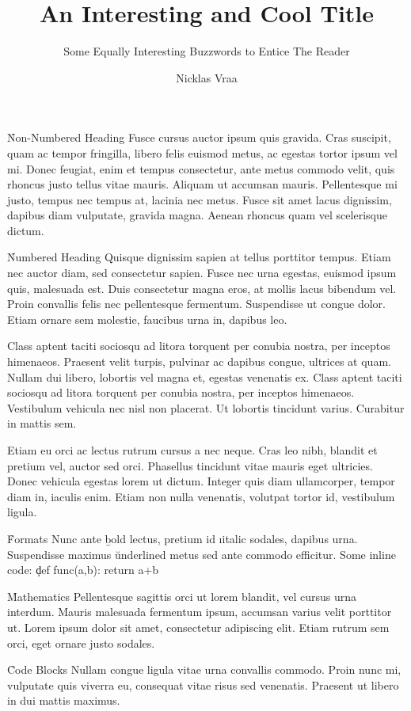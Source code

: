 \documentclass{article}
\title    {An Interesting and Cool Title}
\subtitle {Some Equally Interesting Buzzwords to Entice The Reader}
\author   {Nicklas Vraa}
\begin{document}
\h*{Non-Numbered Heading}
Fusce cursus auctor ipsum quis gravida. Cras suscipit, quam ac tempor fringilla, libero felis euismod metus, ac egestas tortor ipsum vel mi. Donec feugiat, enim et tempus consectetur, ante metus commodo velit, quis rhoncus justo tellus vitae mauris. Aliquam ut accumsan mauris. Pellentesque mi justo, tempus nec tempus at, lacinia nec metus. Fusce sit amet lacus dignissim, dapibus diam vulputate, gravida magna. Aenean rhoncus quam vel scelerisque dictum.

\h{Numbered Heading}
Quisque dignissim sapien at tellus porttitor tempus. Etiam nec auctor diam, sed consectetur sapien. Fusce nec urna egestas, euismod ipsum quis, malesuada est. Duis consectetur magna eros, at mollis lacus bibendum vel. Proin convallis felis nec pellentesque fermentum. Suspendisse ut congue dolor. Etiam ornare sem molestie, faucibus urna in, dapibus leo.

Class aptent taciti sociosqu ad litora torquent per conubia nostra, per inceptos himenaeos. Praesent velit turpis, pulvinar ac dapibus congue, ultrices at quam. Nullam dui libero, lobortis vel magna et, egestas venenatis ex. Class aptent taciti sociosqu ad litora torquent per conubia nostra, per inceptos himenaeos. Vestibulum vehicula nec nisl non placerat. Ut lobortis tincidunt varius. Curabitur in mattis sem.

Etiam eu orci ac lectus rutrum cursus a nec neque. Cras leo nibh, blandit et pretium vel, auctor sed orci. Phasellus tincidunt vitae mauris eget ultricies. Donec vehicula egestas lorem ut dictum. Integer quis diam ullamcorper, tempor diam in, iaculis enim. Etiam non nulla venenatis, volutpat tortor id, vestibulum ligula.

\h{Formats}
Nunc ante \b{bold} lectus, pretium id \i{italic} sodales, dapibus  urna. Suspendisse maximus \u{underlined} metus sed ante commodo efficitur. Some inline code: \c{def func(a,b): return a+b}

\h{Mathematics}
Pellentesque sagittis orci ut lorem blandit, vel cursus urna interdum. Mauris malesuada fermentum ipsum, accumsan varius velit porttitor ut. Lorem ipsum dolor sit amet, consectetur adipiscing elit. Etiam rutrum sem orci, eget ornare justo sodales.


\h{Code Blocks}
Nullam congue ligula vitae urna convallis commodo. Proin nunc mi, vulputate quis viverra eu, consequat vitae risus sed venenatis. Praesent ut libero in dui mattis maximus.
\end{document}
